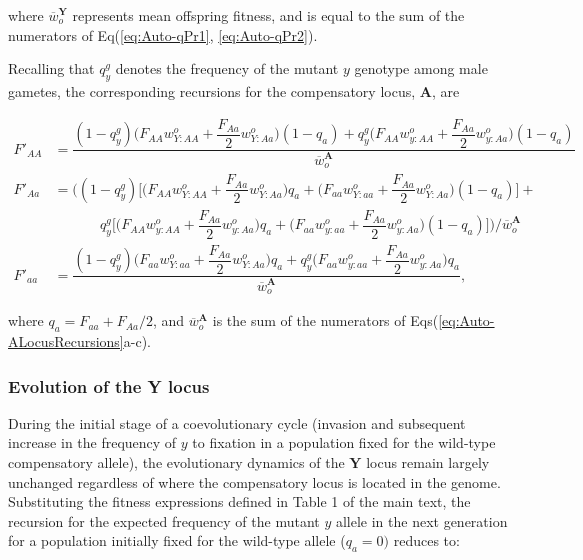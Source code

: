 \documentclass{article}
\begin{document}
\noindent where $\overline{w}^{\mathbf{Y}}_o$ represents mean offspring fitness, and is equal to the sum of the numerators of Eq(\ref{eq:Auto-qPr1}, \ref{eq:Auto-qPr2}).

Recalling that $q^{g}_{y}$ denotes the frequency of the mutant $y$ genotype among male gametes, the corresponding recursions for the compensatory locus, $\mathbf{A}$, are

\begin{subequations}\label{eq:Auto-ALocusRecursions} 
	\begin{align} 
		F'_{AA} &= \dfrac{ (1 - q^{g}_{y}) \bigg(F_{AA} w^{o}_{Y:AA} + \dfrac{F_{Aa}}{2} w^{o}_{Y:Aa} \bigg) (1 - q_a) + q^{g}_{y} \bigg(F_{AA} w^{o}_{y:AA} + \dfrac{F_{Aa}}{2} w^{o}_{y:Aa} \bigg) (1 - q_a)}{\overline{w}^{\mathbf{A}}_o} \label{eq:Auto-ARec1} \\ 
		F'_{Aa} &= \Bigg( (1 - q^{g}_{y}) \Bigg[ \bigg( F_{AA} w^{o}_{Y:AA} + \dfrac{F_{Aa}}{2} w^{o}_{Y:Aa} \bigg) q_a + \bigg( F_{aa} w^{o}_{Y:aa} + \dfrac{F_{Aa}}{2} w^{o}_{Y:Aa} \bigg) (1 - q_a) \bigg] +\nonumber \\
		&~~~~~~~~~~~~~~~q^{g}_{y} \Bigg[ \bigg( F_{AA} w^{o}_{y:AA} + \dfrac{F_{Aa}}{2} w^{o}_{y:Aa} \bigg) q_a	+ \bigg(F_{aa} w^{o}_{y:aa} + \dfrac{F_{Aa}}{2} w^{o}_{y:Aa} \bigg) (1 - q_a) \Bigg] \Bigg) \Bigg/ {\overline{w}^{\mathbf{A}}_o} \label{eq:Auto-ARec2}\\ 
		F'_{aa} &= \dfrac{ (1 - q^{g}_{y}) \bigg( F_{aa} w^{o}_{Y:aa} + \dfrac{F_{Aa}}{2} w^{o}_{Y:Aa} \bigg) q_a + q^{g}_{y} \bigg(F_{aa} w^{o}_{y:aa} + \dfrac{F_{Aa}}{2} w^{o}_{y:Aa} \bigg) q_a}{\overline{w}^{\mathbf{A}}_o}, \label{eq:Auto-ARec3}
	\end{align}
\end{subequations}

\noindent where $q_a = F_{aa} + F_{Aa}/2$, and $\overline{w}^{\mathbf{A}}_o$ is the sum of the numerators of Eqs(\ref{eq:Auto-ALocusRecursions}a-c).


\subsubsection{Evolution of the \textbf{Y} locus}

During the initial stage of a coevolutionary cycle (invasion and subsequent increase in the frequency of $y$ to fixation in a population fixed for the wild-type compensatory allele), the evolutionary dynamics of the $\mathbf{Y}$ locus remain largely unchanged regardless of where the compensatory locus is located in the genome. Substituting the fitness expressions defined in Table 1 of the main text, the recursion for the expected frequency of the mutant $y$ allele in the next generation for a population initially fixed for the wild-type allele ($q_a = 0)$ reduces to:
\end{document}
